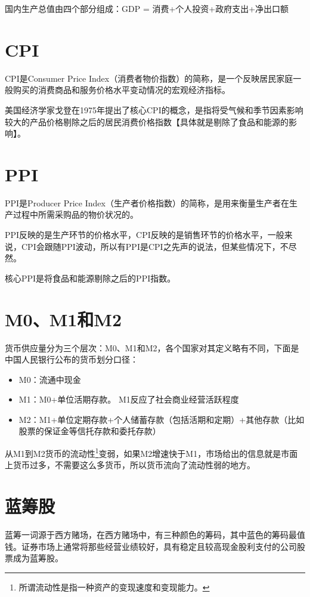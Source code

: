 \documentclass[12pt,oneside]{book}
\begin{document}
国内生产总值由四个部分组成：GDP = 消费+个人投资+政府支出+净出口额


\section{CPI}
CPI是Consumer Price Index（消费者物价指数）的简称，是一个反映居民家庭一般购买的消费商品和服务价格水平变动情况的宏观经济指标。

美国经济学家戈登在1975年提出了核心CPI的概念，是指将受气候和季节因素影响较大的产品价格剔除之后的居民消费价格指数【具体就是剔除了食品和能源的影响】。

\section{PPI}
PPI是Producer Price Index（生产者价格指数）的简称，是用来衡量生产者在生产过程中所需采购品的物价状况的。

PPI反映的是生产环节的价格水平，CPI反映的是销售环节的价格水平，一般来说，CPI会跟随PPI波动，所以有PPI是CPI之先声的说法，但某些情况下，不尽然。

核心PPI是将食品和能源剔除之后的PPI指数。

\section{M0、M1和M2}
货币供应量分为三个层次：M0、M1和M2，各个国家对其定义略有不同，下面是中国人民银行公布的货币划分口径：

\begin{itemize}
\item M0：流通中现金
\item M1：M0+单位活期存款。 M1反应了社会商业经营活跃程度
\item M2：M1+单位定期存款+个人储蓄存款（包括活期和定期）+其他存款（比如股票的保证金等信托存款和委托存款）
\end{itemize}

从M1到M2货币的流动性\footnote{所谓流动性是指一种资产的变现速度和变现能力。}变弱，如果M2增速快于M1，市场给出的信息就是市面上货币过多，不需要这么多货币，所以货币流向了流动性弱的地方。 

\section{蓝筹股}
蓝筹一词源于西方赌场，在西方赌场中，有三种颜色的筹码，其中蓝色的筹码最值钱。证券市场上通常将那些经营业绩较好，具有稳定且较高现金股利支付的公司股票成为蓝筹股。
\end{document}
